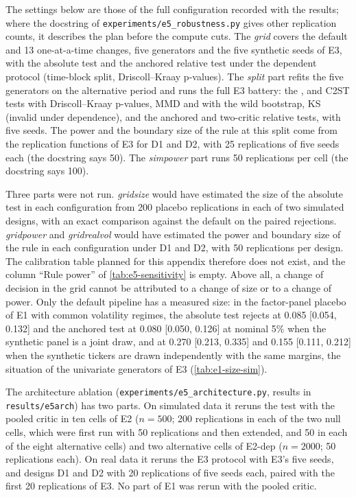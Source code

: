The settings below are those of the full configuration recorded with the results; where the
docstring of \texttt{experiments/e5\_robustness.py} gives other replication counts, it describes
the plan before the compute cuts. The \emph{grid} covers the default and 13 one-at-a-time changes,
five generators and the five synthetic seeds of E3, with the absolute \WC{} test and the anchored
relative test under the dependent protocol (time-block split, Driscoll--Kraay p-values). The
\emph{split} part refits the five generators on the alternative \TRAIN{} period and runs the full
E3 battery: the \WC{}, \LRC{} and C2ST tests with Driscoll--Kraay p-values, MMD and \SigMMD{} with
the wild bootstrap, KS (invalid under dependence), and the anchored and two-critic relative tests,
with five seeds. The power and the boundary size of the rule at this split come from the
replication functions of E3 for D1 and D2, with 25 replications of five seeds each (the docstring
says 50). The \emph{simpower} part runs 50 replications per cell (the docstring says 100).

Three parts were not run. \emph{gridsize} would have estimated the size of the absolute test in
each configuration from 200 placebo replications in each of two simulated designs, with an exact
comparison against the default on the paired rejections. \emph{gridpower} and \emph{gridrealvol}
would have estimated the power and boundary size of the rule in each configuration under D1 and
D2, with 50 replications per design. The calibration table planned for this appendix therefore
does not exist, and the column ``Rule power'' of \cref{tab:e5-sensitivity} is empty. Above all,
a change of decision in the grid cannot be attributed to a change of size or to a change of
power. Only the default pipeline has a measured size: in the factor-panel placebo of E1 with
common volatility regimes, the absolute \WC{} test rejects at 0.085 [0.054, 0.132] and the
anchored test at 0.080 [0.050, 0.126] at nominal 5\% when the synthetic panel is a joint draw,
and at 0.270 [0.213, 0.335] and 0.155 [0.111, 0.212] when the synthetic tickers are drawn
independently with the same margins, the situation of the univariate generators of E3
(\cref{tab:e1-size-sim}).

The architecture ablation (\texttt{experiments/e5\_architecture.py}, results in
\texttt{results/e5arch}) has two parts. On simulated data it reruns the \WC{} test with the
pooled critic in ten cells of E2 ($n=500$; 200 replications in each of the two null cells, which
were first run with 50 replications and then extended, and 50 in each of the eight alternative
cells) and two alternative cells of E2-dep ($n=2000$; 50
replications each). On real data it reruns the E3
protocol with E3's five seeds, and designs D1 and D2 with 20 replications of five seeds each,
paired with the first 20 replications of E3. No part of E1 was rerun with the pooled critic.


